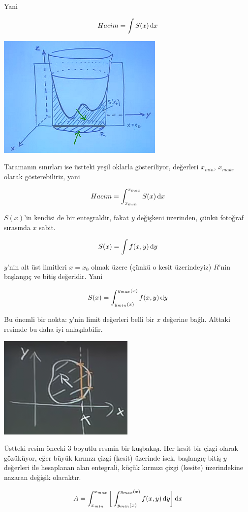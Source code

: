 \documentclass[12pt,fleqn]{article}\usepackage{../../common}
\begin{document}
Yani 

$$ Hacim = \int S(x) \,\mathrm{d} x $$

\includegraphics[height=6cm]{16_6.png}

Taramanın sınırları ise üstteki yeşil oklarla gösteriliyor, değerleri $x_{min}$,
$x_{maks}$ olarak gösterebiliriz, yani

$$ Hacim = \int_{x_{min}}^{x_{max}} S(x) \,\mathrm{d} x $$

$S(x)$'in kendisi de bir entegraldir, fakat $y$ değişkeni üzerinden, çünkü
fotoğraf sırasında $x$ sabit. 

$$ S(x) = \int f(x,y) \,\mathrm{d} y $$

$y$'nin alt üst limitleri $x=x_0$ olmak üzere (çünkü o kesit üzerindeyiz)
$R$'nin başlangıç ve bitiş değeridir. Yani

$$ S(x) = \int_{y_{min}(x)}^{y_{max}(x)} f(x,y) \,\mathrm{d} y $$

Bu önemli bir nokta: $y$'nin limit değerleri belli bir $x$ değerine
bağlı. Alttaki resimde bu daha iyi anlaşılabilir.

\includegraphics[height=5cm]{16_7.png}

Üstteki resim önceki 3 boyutlu resmin bir kuşbakışı. Her kesit bir çizgi olarak
gözüküyor, eğer büyük kırmızı çizgi (kesit) üzerinde isek, başlangıç bitiş $y$
değerleri ile hesaplanan alan entegrali, küçük kırmızı çizgi (kesite)
üzerindekine nazaran değişik olacaktır.

$$ A = \int_{x_{min}}^{x_{max}} 
\bigg[ 
\int_{y_{min}(x)}^{y_{max}(x)} f(x,y) \,\mathrm{d} y 
\bigg] \,\mathrm{d} x
$$
\end{document}
